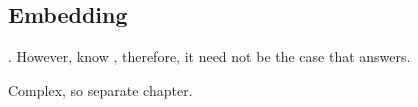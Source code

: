 






\subsection{Embedding}
\label{sec:embedding}

\begin{note}
  \ros{}.
  However, know \fc{}, therefore, it need not be the case that \ros{} answers.

  Complex, so separate chapter.
\end{note}

